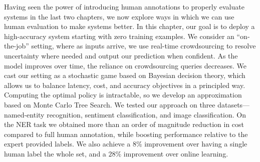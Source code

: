 Having seen the power of introducing human annotations to properly evaluate systems in the last two chapters, we now explore ways in which we can use human evaluation to make systems better.
In this chapter, our goal is to deploy a high-accuracy system starting with zero training examples.
We consider an ``on-the-job'' setting, where as inputs arrive, we use real-time crowdsourcing to resolve uncertainty where needed and output our prediction when confident. As the model improves over time, the reliance on crowdsourcing queries
decreases. We cast our setting as a stochastic game based on Bayesian decision
theory, which allows us to balance latency, cost, and accuracy objectives in a principled way. Computing the optimal policy is intractable, so we develop an approximation based on Monte Carlo Tree Search. We tested our approach on three
datasets---named-entity recognition, sentiment classification, and image classification. On the NER task we obtained more than an order of magnitude reduction in cost compared to full
human annotation, while boosting performance relative to the expert provided labels. We also achieve a $8\%$ \fone{} improvement over having a single
human label the whole set, and a $28\%$ \fone{} improvement over online learning.

